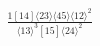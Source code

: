 \documentclass[varwidth, border=5pt]{standalone}
\begin{document}
\begin{my}
$\begin{gathered}
\scriptscriptstyle\frac{1[14]⟨23⟩⟨45⟩⟨12⟩^2}{⟨13⟩^3[15]⟨24⟩^2}
\end{gathered}$
\end{my}
\end{document}
